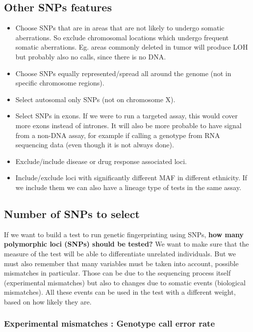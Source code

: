 \subsection{Other SNPs features} 
\begin{itemize}
	\item Choose SNPs that are in areas that are not likely to undergo somatic
	aberrations. So exclude chromosomal locations which undergo frequent somatic
	aberrations. Eg. areas commonly deleted in tumor will produce LOH but
	probably also no calls, since there is no DNA. 
	\item Choose SNPs equally represented/spread all around the genome (not in
	specific chromosome regions).
	\item Select autosomal only SNPs (not on chromosome X).
	\item Select SNPs in exons. If we were to run a targeted assay, this would
	cover more exons instead of intrones. It will also be more probable to have
	signal from a non-DNA assay, for example if calling a genotype from RNA
	sequencing data (even though it is not always done).
	\item Exclude/include disease or drug response associated loci. 
	\item Include/exclude loci with significantly different MAF in different
	ethnicity. If we include them we can also have a lineage type of tests in
	the same assay. 
\end{itemize}


\subsection{Number of SNPs to select} 

If we want to build a test to run genetic fingerprinting using SNPs, \textbf{how
many polymorphic loci (SNPs) should be tested?} We want to make sure that the
measure of the test will be able to differentiate unrelated individuals. But we
must also remember that many variables must be taken into account, possible
mismatches in particular. Those can be due to the sequencing process itself
(experimental mismatches) but also to changes due to somatic events (biological
mismatches). All these events can be used in the test with a different weight,
based on how likely they are. 


\subsubsection{Experimental mismatches : Genotype call error rate}

